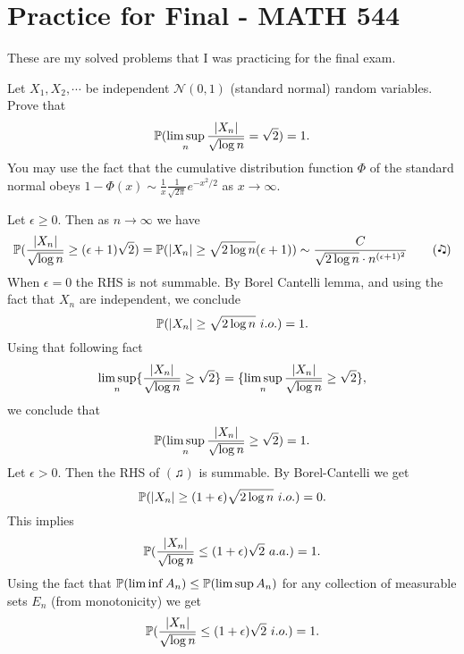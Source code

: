 \chapter{Practice for Final - MATH 544}

These are my solved problems that I was practicing for the final exam.

\begin{problem}
	Let $ X_1,X_2,\cdots $ be independent $ \mathcal{N}(0,1) $ (standard normal) random variables. Prove that
	\[ \mathbb{P}(\limsup_n \frac{|X_n|}{\sqrt{\log n}} = \sqrt{2}) = 1. \]
	You may use the fact that the cumulative distribution function $ \Phi $ of the standard normal obeys $ 1-\Phi(x) \sim \frac{1}{x}\frac{1}{\sqrt{2\pi}}e^{-x^2/2} $ as $ x\to \infty $.
\end{problem}
\begin{solution}
	Let $ \epsilon \geq 0 $. Then as $ n\to\infty $ we have
	\begin{align*}
		 \mathbb{P}(\frac{|X_n|}{\sqrt{\log n}} \geq (\epsilon+1)\sqrt{2}) = \mathbb{P}({|X_n|}\geq {\sqrt{2\log n}} (\epsilon+1)) \sim \frac{C}{\sqrt{2\log n} \cdot n^{(\epsilon+1)^2}} \tag{\twonotes}
	\end{align*}
	When $ \epsilon=0 $ the RHS is not summable. By Borel Cantelli lemma, and using the fact that $ X_n $ are independent, we conclude
	\[ \mathbb{P}(|X_n|\geq \sqrt{2\log n}\ i.o.) = 1. \]
	Using that following fact
	\[ \limsup_n \{\frac{|X_n|}{\sqrt{\log n}}\geq \sqrt{2}\} = \{\limsup_n \frac{|X_n|}{\sqrt{\log n}}\geq \sqrt{2}\}, \]
	we conclude that
	\[ \mathbb{P}({\limsup_n \frac{|X_n|}{\sqrt{\log n}}\geq \sqrt{2}}) = 1. \]
	Let $ \epsilon>0 $. Then the RHS of $ (\twonotes) $ is summable. By Borel-Cantelli we get
	\[ \prob(\abs{X_n}\geq (1+\epsilon)\sqrt{2\log n}\ i.o.) = 0.\]
	This implies
	\[ \mathbb{P}(\frac{|X_n|}{\sqrt{\log n}} \leq (1+\epsilon)\sqrt{2}\ a.a.) = 1. \]
	Using the fact that $ \mathbb{P}(\liminf A_n) \leq \mathbb{P}(\limsup A_n) $ for any collection of measurable sets $ E_n $ (from monotonicity) we get 
	\[ \mathbb{P}(\frac{|X_n|}{\sqrt{\log n}} \leq (1+\epsilon)\sqrt{2}\ i.o.) = 1. \]

\end{solution}